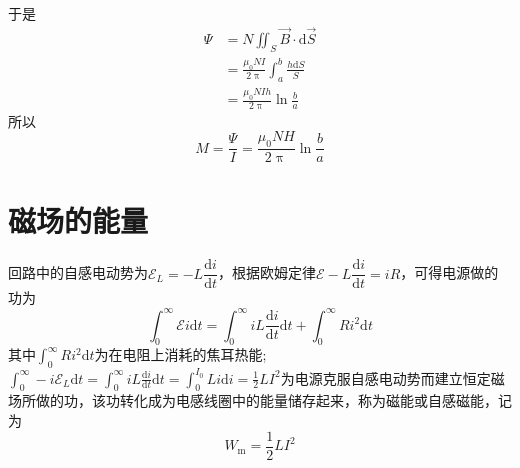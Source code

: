 \documentclass[12pt]{article}
\newcommand{\rmd}{\mathrm{d}}
\newcommand{\deriv}[2]{\frac{\rmd #1}{\rmd #2}}
\newcommand{\dderiv}[2]{\dfrac{\rmd #1}{\rmd #2}}
\begin{document}
于是
\begin{equation*}
    \begin{aligned}
        \varPsi &= N \iint_S \overrightarrow{B} \cdot \rmd \overrightarrow{S} \\
        &= \frac{\mu_0 NI}{2 \uppi} \int_{a}^{b} \frac{h \rmd S}{S} \\
        &= \frac{\mu_0 NIh}{2 \uppi} \ln \frac{b}{a}
    \end{aligned}
\end{equation*}
所以
\begin{equation*}
    M = \frac{\varPsi}{I} = \frac{\mu_0 NH}{2 \uppi} \ln \frac{b}{a}
\end{equation*}

\section{磁场的能量}

回路中的自感电动势为\(\mathcal{E}_L = -L\dderiv{i}{t}\)，根据欧姆定律\(\mathcal{E} - L \dderiv{i}{t} = i R\)，可得电源做的功为
\begin{equation}
    \int_{0}^{\infty} \mathcal{E} i \rmd t = \int_{0}^{\infty} i L\deriv{i}{t} \rmd t + \int_{0}^{\infty} R i^2 \rmd t
\end{equation}
其中$\int_0^{\infty} R i^2 \rmd t$为在电阻上消耗的焦耳热能; $\int_0^{\infty}-i \mathscr{E}_L \rmd t=\int_0^{\infty} i L \deriv{i}{t} \rmd t=\int_0^{I_0} L i \rmd i=\frac{1}{2} L I^2$为电源克服自感电动势而建立恒定磁场所做的功，该功转化成为电感线圈中的能量储存起来，称为磁能或自感磁能，记为
\begin{equation}
W_{\mathrm{m}}=\frac{1}{2} L I^2
\label{14-30}
\end{equation}
\end{document}
